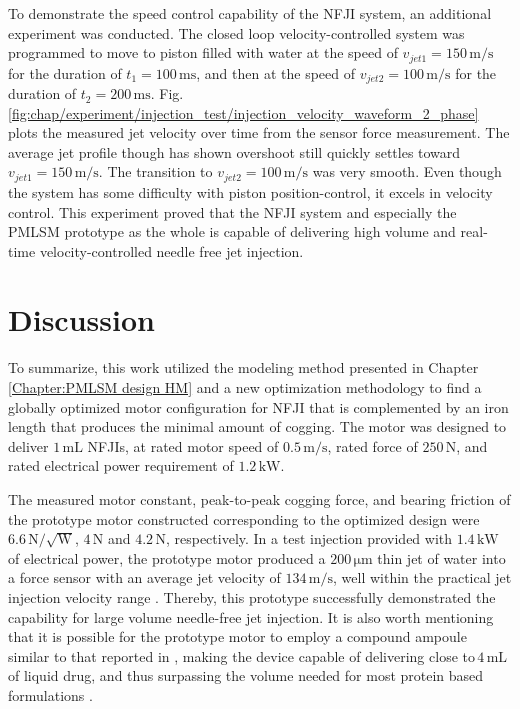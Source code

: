         
            To demonstrate the speed control capability of the \acs{NFJI} system, an additional experiment was conducted. The closed loop velocity-controlled system was programmed to move to piston filled with water at the speed of $v_{jet1}=150\,\mathrm{m/s}$ for the duration of $t_1=100\,\mathrm{ms}$, and then at the speed of $v_{jet2}=100\,\mathrm{m/s}$ for the duration of $t_2=200\,\mathrm{ms}$. Fig.\,\ref{fig:chap/experiment/injection_test/injection_velocity_waveform_2_phase} plots the measured jet velocity over time from the sensor force measurement. The average jet profile though has shown overshoot still quickly settles toward $v_{jet1}=150\,\mathrm{m/s}$. The transition to $v_{jet2}=100\,\mathrm{m/s}$ was very smooth. Even though the system has some difficulty with piston position-control, it excels in velocity control. This experiment proved that the \acs{NFJI} system and especially the \acs{PMLSM} prototype as the whole is capable of delivering high volume and real-time velocity-controlled needle free jet injection.
        
        
        \section{Discussion}                     \label{Chapter:experiment/validation/discussion}
        
        
        To summarize, this work utilized the modeling method presented in Chapter\,\ref{Chapter:PMLSM design HM} and a new optimization methodology to find a globally optimized motor configuration for NFJI that is complemented by an iron length that produces the minimal amount of cogging. The motor was designed to deliver $1\,\mathrm{mL}$ NFJIs, at rated motor speed of $0.5\,\mathrm{m/s}$, rated force of $250\,\mathrm{N}$, and rated electrical power requirement of $1.2\,\mathrm{kW}$. 
        
        
        The measured motor constant, peak-to-peak cogging force, and bearing friction of the prototype motor constructed corresponding to the optimized design were $6.6\,\mathrm{N/\sqrt{W}}$, $4\,\mathrm{N}$ and $4.2\,\mathrm{N}$, respectively. In a test injection provided with $1.4\,\mathrm{kW}$ of electrical power, the prototype motor produced a $200\,\mathrm{\mu m}$ thin jet of water into a force sensor with an average jet velocity of $134\,\mathrm{m/s}$, well within the practical jet injection velocity range \cite{mitragotri2006}. Thereby, this prototype successfully demonstrated the capability for large volume needle-free jet injection. It is also worth mentioning that it is possible for the prototype motor to employ a compound ampoule similar to that reported in \cite{Ruddy2015a,McKeage2018}, making the device capable of delivering close to\,$4\,\mathrm{mL}$ of liquid drug, and thus surpassing the volume needed for most protein based formulations \cite{Hogan2015}.